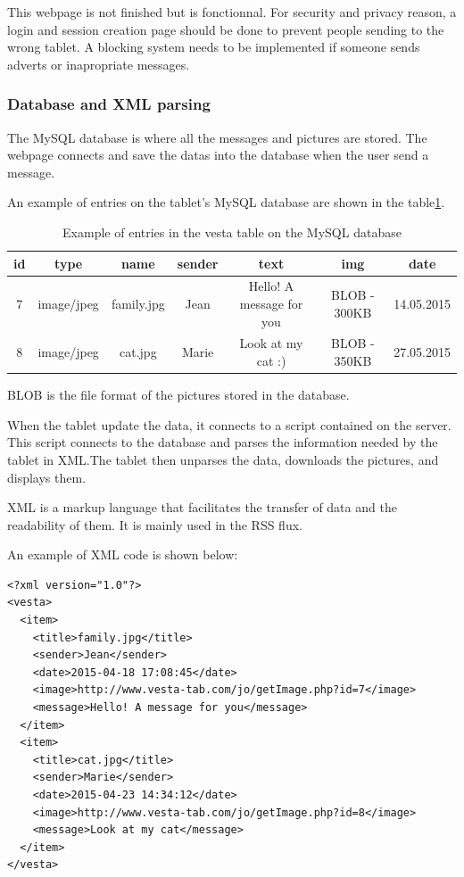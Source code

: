 This webpage is not finished but is fonctionnal. For security and privacy reason, a login and session creation page should be done to prevent people sending to the wrong tablet. A blocking system needs to be implemented if someone sends adverts or inapropriate messages.

\clearpage

\subsubsection{Database and XML parsing}
The MySQL database is where all the messages and pictures are stored. The webpage connects and save the datas into the database when the user send a message.

An example of entries on the tablet's MySQL database are shown in the table\ref{tab:database}.

\begin{table}[!htb]
\begin{tabular}{|c|c|c|c|c|c|c|}
  \hline
  id & type & name & sender & text & img & date \\
  \hline
  7 & image/jpeg & family.jpg & Jean & Hello! A message for you & BLOB - 300KB & 14.05.2015\\
  8 & image/jpeg & cat.jpg & Marie & Look at my cat :) & BLOB - 350KB & 27.05.2015\\
  \hline
\end{tabular}
\caption {Example of entries in the vesta table on the MySQL database}\label{tab:database}
\end{table}

BLOB is the file format of the pictures stored in the database.

When the tablet update the data, it connects to a script contained on the server. This script connects to the database and parses the information needed by the tablet in XML.The tablet then unparses the data, downloads the pictures, and displays them.

XML is a markup language that facilitates the transfer of data and the readability of them. It is mainly used in the RSS flux.


An example of XML code is shown below:

\lstset{
 style=customXML,
 basicstyle=\ttfamily,
 columns=fullflexible,
 showstringspaces=false
}
\begin{lstlisting}
<?xml version="1.0"?>
<vesta>
  <item>
    <title>family.jpg</title>
    <sender>Jean</sender>
    <date>2015-04-18 17:08:45</date>
    <image>http://www.vesta-tab.com/jo/getImage.php?id=7</image>
    <message>Hello! A message for you</message>
  </item>
  <item>
    <title>cat.jpg</title>
    <sender>Marie</sender>
    <date>2015-04-23 14:34:12</date>
    <image>http://www.vesta-tab.com/jo/getImage.php?id=8</image>
    <message>Look at my cat</message>
  </item>
</vesta>
\end{lstlisting}

